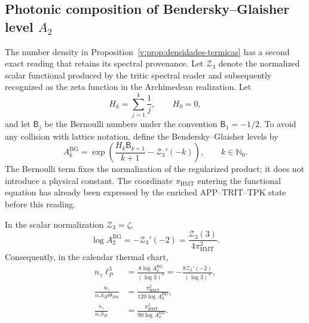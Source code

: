 \subsection{Photonic composition of Bendersky--Glaisher level \texorpdfstring{\(A_2\)}{A2}}
\label{v:subsec:bendersky-fotonica}

The number density in Proposition~\ref{v:prop:densidades-termicas}
has a second exact reading that retains its spectral provenance.
Let \(\mathcal Z_3\) denote the normalized scalar functional produced by
the tritic spectral reader and subsequently recognized as the zeta function
in the Archimedean realization. Let
\[
 H_k=\sum_{j=1}^{k}\frac1j,\qquad H_0=0,
\]
and let \(\mathsf B_j\) be the Bernoulli numbers under the convention
\(\mathsf B_1=-1/2\). To avoid any collision with lattice notation,
define the Bendersky--Glaisher levels by
\begin{equation}
 A_k^{\mathrm{BG}}
 =\exp\!\left(
   \frac{H_k\mathsf B_{k+1}}{k+1}-\mathcal Z_3'(-k)
 \right),\qquad k\in\mathbb N_0.
 \label{v:eq:bendersky-bg}
\end{equation}
The Bernoulli term fixes the normalization of the regularized product; it
does not introduce a physical constant. The coordinate
\(\pi_{\mathrm{HMT}}\) entering the functional equation has already
been expressed by the enriched APP--TRIT--TPK state before this reading.

\begin{proposition}
\label{v:prop:bendersky-fotonica}
In the scalar normalization \(\mathcal Z_3=\zeta\),
\begin{equation}
 \log A_2^{\mathrm{BG}}
 =-\mathcal Z_3'(-2)
 =\frac{\mathcal Z_3(3)}{4\pi_{\mathrm{HMT}}^2}.
 \label{v:eq:bendersky-nivel-dos}
\end{equation}
Consequently, in the calendar thermal chart,
\begin{align}
 n_\gamma\ell_P^3
  &=\frac{8\log A_2^{\mathrm{BG}}}{(\log3)^3}
   =-\frac{8\mathcal Z_3'(-2)}{(\log3)^3},
   \label{v:eq:numero-fotones-bendersky}\\
 \frac{u_\gamma}{n_\gamma k_B\Theta_{108}}
  &=\frac{\pi_{\mathrm{HMT}}^2}{120\log A_2^{\mathrm{BG}}},
   \label{v:eq:energia-media-bendersky}\\
 \frac{s_\gamma}{n_\gamma k_B}
  &=\frac{\pi_{\mathrm{HMT}}^2}{90\log A_2^{\mathrm{BG}}}.
   \label{v:eq:entropia-media-bendersky}
\end{align}
\end{proposition}

